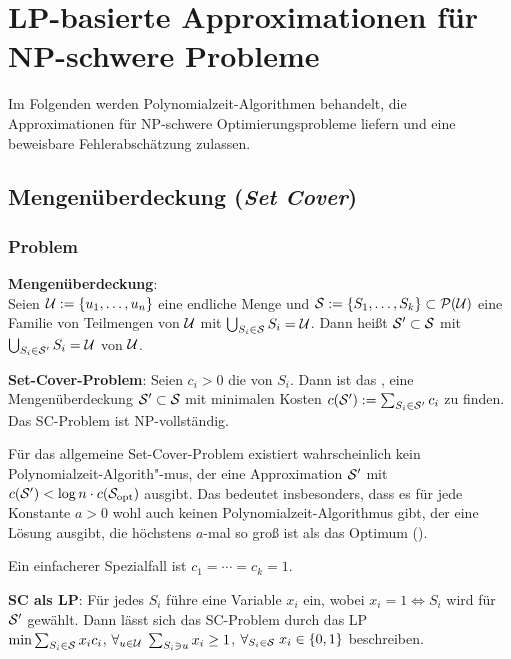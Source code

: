 \section{%
    LP-basierte Approximationen für NP-schwere Probleme%
}

Im Folgenden werden Polynomialzeit-Algorithmen behandelt, die Approximationen für NP-schwere
Optimierungsprobleme liefern und eine beweisbare Fehlerabschätzung zulassen.

\subsection{%
    Mengenüberdeckung (\emph{Set Cover})%
}

\subsubsection{%
    Problem%
}

\textbf{Mengenüberdeckung}:\\
Seien $\U := \{u_1, \dotsc, u_n\}$ eine endliche Menge und
$\S := \{S_1, \dotsc, S_k\} \subset \P(\U)$ eine Familie von Teilmengen von $\U$
mit $\bigcup_{S_i \in \S} S_i = \U$.
Dann heißt $\S' \subset \S$ mit $\bigcup_{S_i \in \S'} S_i = \U$
 von $\U$.

\textbf{Set-Cover-Problem}:
Seien $c_i > 0$ die  von $S_i$.
Dann ist das ,
eine Mengenüberdeckung $\S' \subset \S$ mit minimalen Kosten
$c(\S') := \sum_{S_i \in \S'} c_i$ zu finden.\\
Das SC-Problem ist NP-vollständig.

Für das allgemeine Set-Cover-Problem existiert wahrscheinlich kein Polynomialzeit-Algorith"-mus,
der eine Approximation $\S'$ mit $c(\S') < \log n \cdot c(\S_\opt)$ ausgibt.
Das bedeutet insbesonders, dass es für jede Konstante $a > 0$ wohl auch keinen
Polynomialzeit-Algorithmus gibt, der
eine Lösung ausgibt, die höchstens $a$-mal so groß ist als das Optimum
().

Ein einfacherer Spezialfall ist $c_1 = \dotsb = c_k = 1$.

\linie

\textbf{SC als LP}:
Für jedes $S_i$ führe eine Variable $x_i$ ein, wobei $x_i = 1 \iff S_i$ wird für $\S'$ gewählt.
Dann lässt sich das SC-Problem durch das LP\\
$\min \sum_{S_i \in \S} x_i c_i$, $\forall_{u \in \U}\; \sum_{S_i \ni u} x_i \ge 1$,
$\forall_{S_i \in \S}\; x_i \in \{0, 1\}$ beschreiben.

